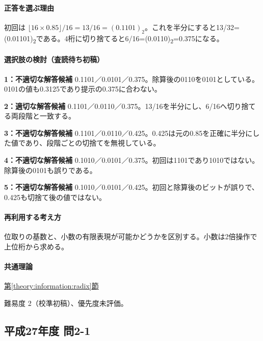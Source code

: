 \paragraph{正答を選ぶ理由} 初回は \(\lfloor16\times0.85\rfloor/16=13/16=(0.1101)_2\)。これを半分にすると13/32=(0.01101)\textsubscript{2}である。4桁に切り捨てると6/16=(0.0110)\textsubscript{2}=0.375になる。

\paragraph{選択肢の検討（査読待ち初稿）}

\noindent\textbf{1：不適切な解答候補} 0.1101／0.0101／0.375。除算後の0110を0101としている。0101の値も0.3125であり提示の0.375に合わない。\par

\noindent\textbf{2：適切な解答候補} 0.1101／0.0110／0.375。13/16を半分にし、6/16へ切り捨てる両段階と一致する。\par

\noindent\textbf{3：不適切な解答候補} 0.1101／0.0110／0.425。0.425は元の0.85を正確に半分にした値であり、段階ごとの切捨てを無視している。\par

\noindent\textbf{4：不適切な解答候補} 0.1010／0.0101／0.375。初回は1101であり1010ではない。除算後の0101も誤りである。\par

\noindent\textbf{5：不適切な解答候補} 0.1010／0.0101／0.425。初回と除算後のビットが誤りで、0.425も切捨て後の値ではない。\par

\paragraph{再利用する考え方} 位取りの基数と、小数の有限表現が可能かどうかを区別する。小数は2倍操作で上位桁から求める。

\paragraph{共通理論} \hyperref[theory:information:radix]{第\ref*{theory:information:radix}節}

\par 難易度 2（校準初稿）、優先度未評価。

\subsection{平成27年度 問2-1}
\label{q:h27-reg-basic-2-1}

